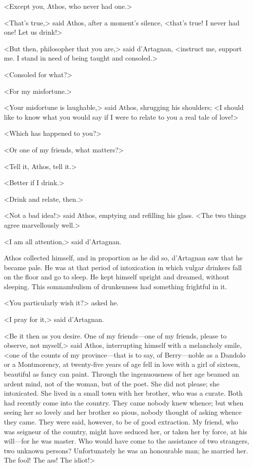 <Except you, Athos, who never had one.> 

<That's true,> said Athos, after a moment's silence, <that's true! I never had one! Let us drink!> 

<But then, philosopher that you are,> said d'Artagnan, <instruct me, support me. I stand in need of being taught and consoled.> 

<Consoled for what?> 

<For my misfortune.> 

<Your misfortune is laughable,> said Athos, shrugging his shoulders; <I should like to know what you would say if I were to relate to you a real tale of love!> 

<Which has happened to you?> 

<Or one of my friends, what matters?> 

<Tell it, Athos, tell it.> 

<Better if I drink.> 

<Drink and relate, then.> 

<Not a bad idea!> said Athos, emptying and refilling his glass. <The two things agree marvellously well.> 

<I am all attention,> said d'Artagnan. 

Athos collected himself, and in proportion as he did so, d'Artagnan saw that he became pale. He was at that period of intoxication in which vulgar drinkers fall on the floor and go to sleep. He kept himself upright and dreamed, without sleeping. This somnambulism of drunkenness had something frightful in it. 

<You particularly wish it?> asked he. 

<I pray for it,> said d'Artagnan. 

<Be it then as you desire. One of my friends---one of my friends, please to observe, not myself,> said Athos, interrupting himself with a melancholy smile, <one of the counts of my province---that is to say, of Berry---noble as a Dandolo or a Montmorency, at twenty-five years of age fell in love with a girl of sixteen, beautiful as fancy can paint. Through the ingenuousness of her age beamed an ardent mind, not of the woman, but of the poet. She did not please; she intoxicated. She lived in a small town with her brother, who was a curate. Both had recently come into the country. They came nobody knew whence; but when seeing her so lovely and her brother so pious, nobody thought of asking whence they came. They were said, however, to be of good extraction. My friend, who was seigneur of the country, might have seduced her, or taken her by force, at his will---for he was master. Who would have come to the assistance of two strangers, two unknown persons? Unfortunately he was an honourable man; he married her. The fool! The ass! The idiot!> 

